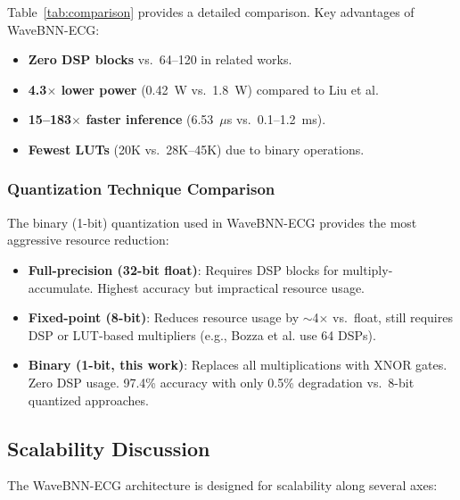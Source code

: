 \documentclass[conference]{IEEEtran}
\begin{document}
Table~\ref{tab:comparison} provides a detailed comparison. Key advantages of WaveBNN-ECG:
\begin{itemize}
    \item \textbf{Zero DSP blocks} vs.\ 64--120 in related works.
    \item \textbf{4.3$\times$ lower power} (0.42~W vs.\ 1.8~W) compared to Liu et al.
    \item \textbf{15--183$\times$ faster inference} (6.53~$\mu$s vs.\ 0.1--1.2~ms).
    \item \textbf{Fewest LUTs} (20K vs.\ 28K--45K) due to binary operations.
\end{itemize}

\subsubsection{Quantization Technique Comparison}

The binary (1-bit) quantization used in WaveBNN-ECG provides the most aggressive resource reduction:
\begin{itemize}
    \item \textbf{Full-precision (32-bit float)}: Requires DSP blocks for multiply-accumulate. Highest accuracy but impractical resource usage.
    \item \textbf{Fixed-point (8-bit)}: Reduces resource usage by $\sim$4$\times$ vs.\ float, still requires DSP or LUT-based multipliers (e.g., Bozza et al. use 64 DSPs).
    \item \textbf{Binary (1-bit, this work)}: Replaces all multiplications with XNOR gates. Zero DSP usage. 97.4\% accuracy with only 0.5\% degradation vs.\ 8-bit quantized approaches.
\end{itemize}

\subsection{Scalability Discussion}

The WaveBNN-ECG architecture is designed for scalability along several axes:
\end{document}
